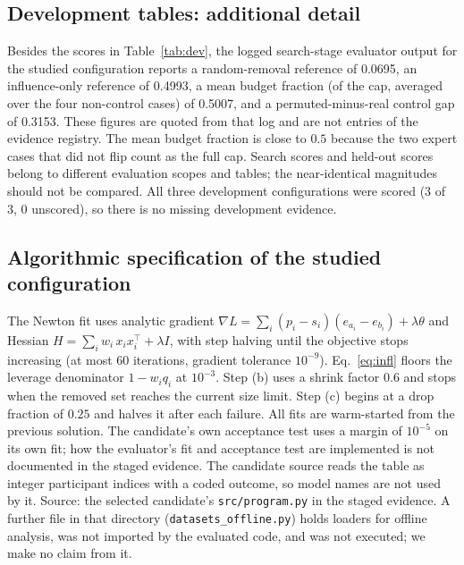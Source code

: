 \documentclass{article}
\begin{document}
\subsection{Development tables: additional detail}
Besides the scores in Table~\ref{tab:dev}, the logged search-stage evaluator output for the studied configuration reports a random-removal reference of 0.0695, an influence-only reference of 0.4993, a mean budget fraction (of the cap, averaged over the four non-control cases) of 0.5007, and a permuted-minus-real control gap of 0.3153. These figures are quoted from that log and are not entries of the evidence registry. %
The mean budget fraction is close to $0.5$ because the two expert cases that did not flip count as the full cap. Search scores and held-out scores belong to different evaluation scopes and tables; the near-identical magnitudes should not be compared. All three development configurations were scored (3 of 3, 0 unscored), so there is no missing development evidence.

\subsection{Algorithmic specification of the studied configuration}
The Newton fit uses analytic gradient $\nabla L=\sum_i (p_i-s_i)(e_{a_i}-e_{b_i})+\lambda\theta$ and Hessian $H=\sum_i w_i\,x_ix_i^\top+\lambda I$, with step halving until the objective stops increasing (at most 60 iterations, gradient tolerance $10^{-9}$). Eq.~\eqref{eq:infl} floors the leverage denominator $1-w_iq_i$ at $10^{-3}$. Step (b) uses a shrink factor $0.6$ and stops when the removed set reaches the current size limit. Step (c) begins at a drop fraction of $0.25$ and halves it after each failure. All fits are warm-started from the previous solution. The candidate's own acceptance test uses a margin of $10^{-5}$ on its own fit; how the evaluator's fit and acceptance test are implemented is not documented in the staged evidence. The candidate source reads the table as integer participant indices with a coded outcome, so model names are not used by it. Source: the selected candidate's \texttt{src/program.py} in the staged evidence. A further file in that directory (\texttt{datasets\_offline.py}) holds loaders for offline analysis, was not imported by the evaluated code, and was not executed; we make no claim from it.
\end{document}
